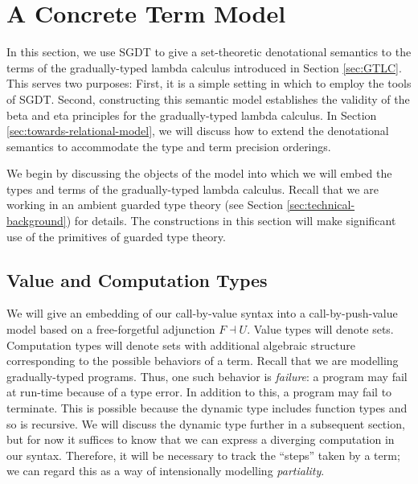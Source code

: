 \section{A Concrete Term Model}\label{sec:concrete-term-model}

In this section, we use SGDT to give a set-theoretic denotational semantics to
the terms of the gradually-typed lambda calculus introduced in Section
\ref{sec:GTLC}. This serves two purposes: First, it is a simple setting in which
to employ the tools of SGDT. Second, constructing this semantic model
establishes the validity of the beta and eta principles for the gradually-typed
lambda calculus.
%
In Section \ref{sec:towards-relational-model}, we will discuss how to extend the
denotational semantics to accommodate the type and term precision orderings.


We begin by discussing the objects of the model into which we will embed
the types and terms of the gradually-typed lambda calculus. Recall that we are
working in an ambient guarded type theory (see Section
\ref{sec:technical-background}) for details. The constructions in this section
will make significant use of the primitives of guarded type theory.

\subsection{Value and Computation Types}



We will give an embedding of our call-by-value syntax into a call-by-push-value
model based on a free-forgetful adjunction $F \dashv U$. Value types will denote
sets. Computation types will denote sets with additional algebraic structure
corresponding to the possible behaviors of a term. Recall that we are modelling
gradually-typed programs. Thus, one such behavior is \emph{failure}: a program
may fail at run-time because of a type error. In addition to this, a program may
fail to terminate. This is possible because the dynamic type includes function
types and so is recursive. We will discuss the dynamic type further in a
subsequent section, but for now it suffices to know that we can express a
diverging computation in our syntax. Therefore, it will be necessary to track
the ``steps'' taken by a term; we can regard this as a way of intensionally
modelling \emph{partiality}.

